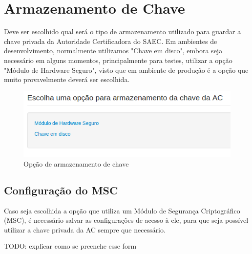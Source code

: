 
\section{Armazenamento de Chave}
Deve ser escolhido qual será o tipo de armazenamento utilizado para guardar a chave privada da Autoridade Certificadora do SAEC. Em ambientes de desenvolvimento, normalmente utilizamos "Chave em disco", embora seja necessário em alguns momentos, principalmente para testes, utilizar a opção "Módulo de Hardware Seguro", visto que em ambiente de produção é a opção que muito provavelmente deverá ser escolhida.
    
    \begin{figure}[h]
     \centering
     \includegraphics[scale=0.6]{images/armazenachave.png}
     \caption{Opção de armazenamento de chave}
     \label{fig:armazenachave}
\end{figure}

\subsection{Configuração do MSC}
Caso seja escolhida a opção que utiliza um Módulo de Segurança Criptográfico (MSC), é necessário salvar as configurações de acesso à ele, para que seja possível utilizar a chave privada da AC sempre que necessário.

TODO: explicar como se preenche esse form
    
